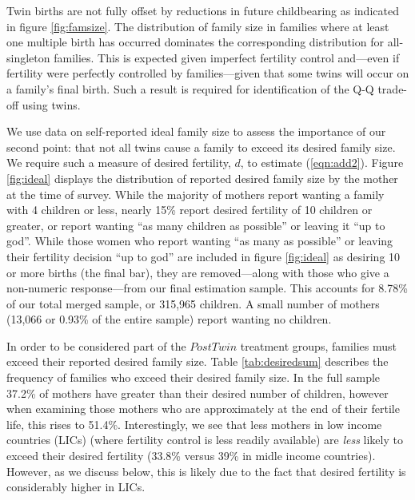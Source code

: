\documentclass{article}[12pt,subeqn]
\begin{document}
\begin{spacing}{1.5}
Twin births are not fully offset by reductions in future childbearing as indicated in figure \ref{fig:famsize}.  The distribution of family size in families where at least one multiple birth has occurred dominates the corresponding distribution for all-singleton families.  This is expected given imperfect fertility control and---even if fertility were perfectly controlled by families---given that some twins will occur on a family’s final birth.  Such a result is required for identification of the Q-Q trade-off using twins.

We use data on self-reported ideal family size to assess the importance of our second point: that not all twins cause a family to exceed its desired family size.  We require such a measure of desired fertility, $d$, to estimate (\ref{eqn:add2}).  Figure \ref{fig:ideal} displays the distribution of reported desired family size by the mother at the time of survey.  While the majority of mothers report wanting a family with 4 children or less, nearly 15\% report desired fertility of 10 children or greater, or report wanting “as many children as possible” or leaving it “up to god”.  While those women who report wanting ``as many as possible'' or leaving their fertility decision ``up to god'' are included in figure \ref{fig:ideal} as desiring 10 or more births (the final bar), they are removed---along with those who give a non-numeric response---from our final estimation sample.  This accounts for 8.78\% of our total merged sample, or 315,965 children.  A small number of mothers (13,066 or 0.93\% of the entire sample) report wanting no children.

In order to be considered part of the $PostTwin$ treatment groups, families must exceed their reported desired family size.  Table \ref{tab:desiredsum} describes the frequency of families who exceed their desired family size.  In the full sample 37.2\% of mothers have greater than their desired number of children, however when examining those mothers who are approximately at the end of their fertile life, this rises to 51.4\%.  Interestingly, we see that less mothers in low income countries (LICs) (where fertility control is less readily available) are \emph{less} likely to exceed their desired fertility (33.8\% versus 39\% in midle income countries).  However, as we discuss below, this is likely due to the fact that desired fertility is considerably higher in LICs.


\end{spacing}
\end{document}
